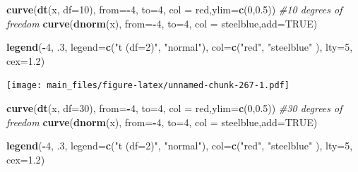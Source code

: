 \documentclass[
]{book}
\newenvironment{Shaded}{\begin{snugshade}}{\end{snugshade}}
\newcommand{\AttributeTok}[1]{\textcolor[rgb]{0.13,0.29,0.53}{#1}}
\newcommand{\CommentTok}[1]{\textcolor[rgb]{0.56,0.35,0.01}{\textit{#1}}}
\newcommand{\ConstantTok}[1]{\textcolor[rgb]{0.56,0.35,0.01}{#1}}
\newcommand{\DecValTok}[1]{\textcolor[rgb]{0.00,0.00,0.81}{#1}}
\newcommand{\FloatTok}[1]{\textcolor[rgb]{0.00,0.00,0.81}{#1}}
\newcommand{\FunctionTok}[1]{\textcolor[rgb]{0.13,0.29,0.53}{\textbf{#1}}}
\newcommand{\NormalTok}[1]{#1}
\newcommand{\SpecialCharTok}[1]{\textcolor[rgb]{0.81,0.36,0.00}{\textbf{#1}}}
\newcommand{\StringTok}[1]{\textcolor[rgb]{0.31,0.60,0.02}{#1}}
\begin{document}
\begin{Shaded}
\begin{Highlighting}[]
\FunctionTok{curve}\NormalTok{(}\FunctionTok{dt}\NormalTok{(x, }\AttributeTok{df=}\DecValTok{10}\NormalTok{), }\AttributeTok{from=}\SpecialCharTok{{-}}\DecValTok{4}\NormalTok{, }\AttributeTok{to=}\DecValTok{4}\NormalTok{, }\AttributeTok{col =} \StringTok{\textquotesingle{}red\textquotesingle{}}\NormalTok{,}\AttributeTok{ylim=}\FunctionTok{c}\NormalTok{(}\DecValTok{0}\NormalTok{,}\FloatTok{0.5}\NormalTok{)) }\CommentTok{\#10 degrees of freedom}
\FunctionTok{curve}\NormalTok{(}\FunctionTok{dnorm}\NormalTok{(x), }\AttributeTok{from=}\SpecialCharTok{{-}}\DecValTok{4}\NormalTok{, }\AttributeTok{to=}\DecValTok{4}\NormalTok{, }\AttributeTok{col =} \StringTok{\textquotesingle{}steelblue\textquotesingle{}}\NormalTok{,}\AttributeTok{add=}\ConstantTok{TRUE}\NormalTok{) }

\FunctionTok{legend}\NormalTok{(}\SpecialCharTok{{-}}\DecValTok{4}\NormalTok{, .}\DecValTok{3}\NormalTok{, }\AttributeTok{legend=}\FunctionTok{c}\NormalTok{(}\StringTok{"t (df=2)"}\NormalTok{, }\StringTok{"normal"}\NormalTok{),}
       \AttributeTok{col=}\FunctionTok{c}\NormalTok{(}\StringTok{"red"}\NormalTok{, }\StringTok{"steelblue"}\NormalTok{ ), }\AttributeTok{lty=}\DecValTok{5}\NormalTok{, }\AttributeTok{cex=}\FloatTok{1.2}\NormalTok{)}
\end{Highlighting}
\end{Shaded}

\texttt{[image: main\_files/figure-latex/unnamed-chunk-267-1.pdf]}

\begin{Shaded}
\begin{Highlighting}[]
\FunctionTok{curve}\NormalTok{(}\FunctionTok{dt}\NormalTok{(x, }\AttributeTok{df=}\DecValTok{30}\NormalTok{), }\AttributeTok{from=}\SpecialCharTok{{-}}\DecValTok{4}\NormalTok{, }\AttributeTok{to=}\DecValTok{4}\NormalTok{, }\AttributeTok{col =} \StringTok{\textquotesingle{}red\textquotesingle{}}\NormalTok{,}\AttributeTok{ylim=}\FunctionTok{c}\NormalTok{(}\DecValTok{0}\NormalTok{,}\FloatTok{0.5}\NormalTok{)) }\CommentTok{\#30 degrees of freedom}
\FunctionTok{curve}\NormalTok{(}\FunctionTok{dnorm}\NormalTok{(x), }\AttributeTok{from=}\SpecialCharTok{{-}}\DecValTok{4}\NormalTok{, }\AttributeTok{to=}\DecValTok{4}\NormalTok{, }\AttributeTok{col =} \StringTok{\textquotesingle{}steelblue\textquotesingle{}}\NormalTok{,}\AttributeTok{add=}\ConstantTok{TRUE}\NormalTok{) }

\FunctionTok{legend}\NormalTok{(}\SpecialCharTok{{-}}\DecValTok{4}\NormalTok{, .}\DecValTok{3}\NormalTok{, }\AttributeTok{legend=}\FunctionTok{c}\NormalTok{(}\StringTok{"t (df=2)"}\NormalTok{, }\StringTok{"normal"}\NormalTok{),}
       \AttributeTok{col=}\FunctionTok{c}\NormalTok{(}\StringTok{"red"}\NormalTok{, }\StringTok{"steelblue"}\NormalTok{ ), }\AttributeTok{lty=}\DecValTok{5}\NormalTok{, }\AttributeTok{cex=}\FloatTok{1.2}\NormalTok{)}
\end{Highlighting}
\end{Shaded}
\end{document}
